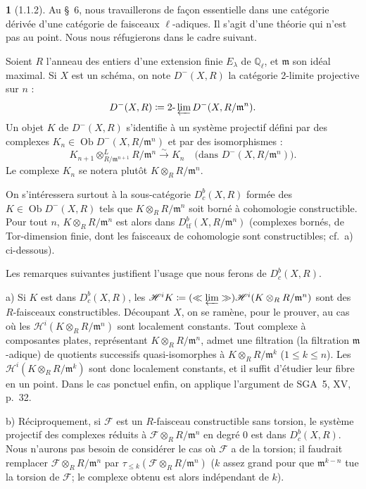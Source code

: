 \documentclass[12pt,a4paper]{article}
\theoremstyle{plain}
\theoremstyle{definition}
\theoremstyle{definition}
\newtheorem{para}{}[section]
\theoremstyle{remark}
\DeclareMathOperator{\Ob}{Ob}
\newcommand{\limproj}{\varprojlim}
\begin{document}
\begin{para}[1.1.2]
Au \S~6, nous travaillerons de fa\c con essentielle dans une cat\'egorie d\'eriv\'ee d'une cat\'egorie de faisceaux $\ell$-adiques. Il s'agit d'une th\'eorie qui n'est pas au point. Nous nous r\'efugierons dans le cadre suivant.

Soient $R$ l'anneau des entiers d'une extension finie $E_\lambda$ de $\mathbb{Q}_\ell$, et $\mathfrak{m}$ son id\'eal maximal. Si $X$ est un sch\'ema, on note $D^-(X, R)$ la cat\'egorie 2-limite projective sur $n$ :
\[D^-(X, R) \coloneqq 2\text{-}\limproj D^-(X, R/\mathfrak{m}^n).\]
Un objet $K$ de $D^-(X, R)$ s'identifie \`a un syst\`eme projectif d\'efini par des complexes $K_n \in \Ob D^-(X, R/\mathfrak{m}^n)$ et par des isomorphismes :
\[K_{n+1} \otimes^L_{R/\mathfrak{m}^{n+1}} R/\mathfrak{m}^n \xrightarrow{\sim} K_n \quad \text{(dans } D^-(X, R/\mathfrak{m}^n)\text{)}.\]
Le complexe $K_n$ se notera plut\^ot $K \otimes_R R/\mathfrak{m}^n$.

On s'int\'eressera surtout \`a la sous-cat\'egorie $D^b_c(X, R)$ form\'ee des $K \in \Ob D^-(X, R)$ tels que $K \otimes_R R/\mathfrak{m}^n$ soit born\'e \`a cohomologie constructible. Pour tout $n$, $K \otimes_R R/\mathfrak{m}^n$ est alors dans $D^b_{\text{tf}}(X, R/\mathfrak{m}^n)$ (complexes born\'es, de Tor-dimension finie, dont les faisceaux de cohomologie sont constructibles; cf.~a) ci-dessous).

Les remarques suivantes justifient l'usage que nous ferons de $D^b_c(X, R)$.

a) Si $K$ est dans $D^b_c(X, R)$, les $\mathscr{H}^i K \coloneqq (\ll \limproj \gg) \mathscr{H}^i(K \otimes_R R/\mathfrak{m}^n)$ sont des $R$-faisceaux constructibles. D\'ecoupant $X$, on se ram\`ene, pour le prouver, au cas o\`u les $\mathscr{H}^i(K \otimes_R R/\mathfrak{m}^n)$ sont localement constants. Tout complexe \`a composantes plates, repr\'esentant $K \otimes_R R/\mathfrak{m}^n$, admet une filtration (la filtration $\mathfrak{m}$-adique) de quotients successifs quasi-isomorphes \`a $K \otimes_R R/\mathfrak{m}^k$ ($1 \leq k \leq n$). Les $\mathscr{H}^i(K \otimes_R R/\mathfrak{m}^k)$ sont donc localement constants, et il suffit d'\'etudier leur fibre en un point. Dans le cas ponctuel enfin, on applique l'argument de SGA~5, XV, p.~32.

b) R\'eciproquement, si $\mathscr{F}$ est un $R$-faisceau constructible sans torsion, le syst\`eme projectif des complexes r\'eduits \`a $\mathscr{F} \otimes_R R/\mathfrak{m}^n$ en degr\'e $0$ est dans $D^b_c(X, R)$. Nous n'aurons pas besoin de consid\'erer le cas o\`u $\mathscr{F}$ a de la torsion; il faudrait remplacer $\mathscr{F} \otimes_R R/\mathfrak{m}^n$ par $\tau_{\leq k}(\mathscr{F} \otimes_R R/\mathfrak{m}^n)$ ($k$ assez grand pour que $\mathfrak{m}^{k-n}$ tue la torsion de $\mathscr{F}$; le complexe obtenu est alors ind\'ependant de $k$).


\end{para}
\end{document}
